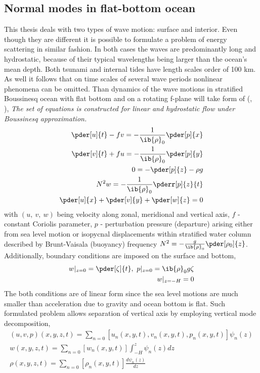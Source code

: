 \subsection{Normal modes in flat-bottom ocean}
This thesis deals with two types of wave motion: surface and interior. Even though they are different it is possible to formulate a problem of energy scattering in similar fashion. In both cases the waves are predominantly long and hydrostatic, because of their typical wavelengths being larger than the ocean's mean depth. Both tsunami and internal tides have length scales order of 100 km. As well it follows that on time scales of several wave periods nonlinear phenomena can be omitted. Than dynamics of the wave motions in stratified Boussinesq ocean with flat bottom and on a rotating f-plane will take form of (\cite{kundu2008fluid}, \cite{cushman2011introduction}),
\textit{The set of equations is constructed for linear and hydrostatic flow under Boussinesq approximation. }
\begin{align}
\pder[u]{t} - f v = -\frac{1}{\ib{\rho}_0}\pder[p]{x}\\
\pder[v]{t} + f u = -\frac{1}{\ib{\rho}_0}\pder[p]{y}\\
0 = -\pder[p]{z} - \rho g\\
N^2 w = -\frac{1}{\ib{\rho}_0} \pderr[p]{z}{t}\\
\pder[u]{x} + \pder[v]{y} + \pder[w]{z} = 0
\end{align}
with $(u,~v,~w)$ being velocity along zonal, meridional and vertical axis, $f$ - constant Coriolis parameter, $p$ - perturbation pressure (departure) arising either from sea level motion or isopycnal displacements within stratified water column described by Brunt-Vaisala (buoyancy) frequency $N^2 = -\frac{g}{\ib{\rho}_0}\pder[\rho_0]{z}$. Additionally, boundary conditions are imposed on the surface and bottom,
\begin{align}
w|_{z = 0} = \pder[\zeta]{t},~p|_{z = 0} = \ib{\rho}_0 g \zeta\\
w|_{z = -H} = 0
\end{align}
The both conditions are of linear form since the sea level motions are much smaller than acceleration due to gravity and ocean bottom is flat. Such formulated problem allows separation of vertical axis by employing vertical mode decomposition,
\begin{align}
(u, v, p)(x,y,z,t) = \sum_{n = 0} [u_n(x,y,t), v_n(x,y,t), p_n(x,y,t)]\psi_n(z)\\
w(x,y,z,t) = \sum_{n = 0} [w_n(x,y,t)] \int_{-H}^z \psi_n(z) dz\\
\rho(x,y,z,t) = \sum_{n = 0} [\rho_n(x,y,t)] \frac{d \psi_n(z)}{dz}
\end{align}
